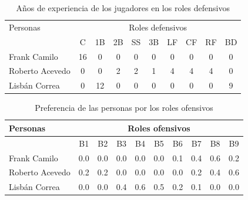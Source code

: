 \begin{table}[H]
	\centering
	\caption{Años de experiencia de los jugadores en los roles defensivos}\label{exp-def}

	\begin{tabular}{l | c c c c c c c c c }
		\toprule[1.7pt]
		\multicolumn{1}{l}{Personas} &    \multicolumn{9}{c}{Roles defensivos}  \\ \cline{1-10}
		                                                           & C  & 1B & 2B & SS & 3B & LF & CF & RF & BD \\ \cline{2-10}
		Frank Camilo                                               & 16 & 0  & 0  & 0  & 0  & 0  & 0  & 0  & 0                           \\
		Roberto Acevedo                                            & 0  & 0  & 2  & 2  & 1  & 4  & 4  & 4  & 0                            \\
		Lisbán Correa                                              & 0  & 12 & 0  & 0  & 0  & 0  & 0  & 0  & 9\\
		\bottomrule[1pt]                             
	\end{tabular}

\end{table}


\begin{table}[H]
		\centering
	\caption{Preferencia de las personas por los roles ofensivos}\label{pref-rol-of-pel}
	\begin{tabular}{l | c c c c c c c c c}
		\toprule[1.7pt]
		\multicolumn{1}{l}{Personas} &         \multicolumn{9}{c}{Roles ofensivos}         \\ \midrule
		                                                           & B1  & B2  & B3  & B4  & B5  & B6  & B7  & B8  & B9  \\ \cline{2-10}
		Frank Camilo                                               & 0.0 & 0.0 & 0.0 & 0.0 & 0.0 & 0.1 & 0.4 & 0.6 & 0.2 \\
		Roberto Acevedo                                            & 0.2 & 0.2 & 0.0 & 0.0 & 0.0 & 0.0 & 0.2 & 0.4 & 0.6 \\
		Lisbán Correa                                              & 0.0 & 0.0 & 0.4 & 0.6 & 0.5 & 0.2 & 0.1 & 0.0 & 0.0 \\
		\bottomrule[1.2pt]                          
	\end{tabular}
\end{table}

